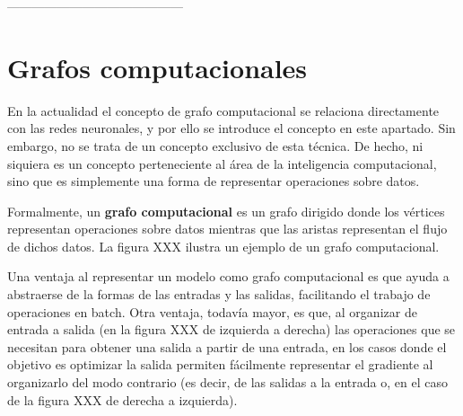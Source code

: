 ------------------------------------------












\section{Grafos computacionales}


En la actualidad el concepto de grafo computacional se relaciona directamente con las redes neuronales, y por ello se introduce el concepto en este apartado. Sin embargo, no se trata de un concepto exclusivo de esta técnica. De hecho, ni siquiera es un concepto perteneciente al área de la inteligencia computacional, sino que es simplemente una forma de representar operaciones sobre datos.

Formalmente, un \textbf{grafo computacional} es un grafo dirigido donde los vértices representan operaciones sobre datos mientras que las aristas representan el flujo de dichos datos. La figura XXX ilustra un ejemplo de un grafo computacional.

Una ventaja al representar un modelo como grafo computacional es que ayuda a abstraerse de la formas de las entradas y las salidas, facilitando el trabajo de operaciones en batch. Otra ventaja, todavía mayor, es que, al organizar de entrada a salida (en la figura XXX de izquierda a derecha) las operaciones que se necesitan para obtener una salida a partir de una entrada, en los casos donde el objetivo es optimizar la salida permiten fácilmente representar el gradiente al organizarlo del modo contrario (es decir, de las salidas a la entrada o, en el caso de la figura XXX de derecha a izquierda).






















